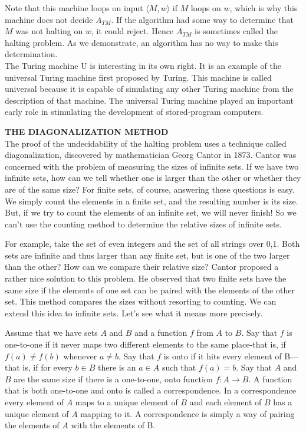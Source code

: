 \documentclass[main.tex]{subfiles}
\begin{document}
Note that this machine loops on input $\langle M, w \rangle$ if $M$ loops on $w$, which is why
this machine does not decide $A_{TM}$. If the algorithm had some way to determine
that $M$ was not halting on $w$, it could reject. Hence $A_{TM}$ is sometimes called
the halting problem. As we demonstrate, an algorithm has no way to make this
determination.\\
The Turing machine U is interesting in its own right. It is an example of
the universal Turing machine first proposed by Turing. This machine is called
universal because it is capable of simulating any other Turing machine from the
description of that machine. The universal Turing machine played an important
early role in stimulating the development of stored-program computers.
\par \textbf{THE DIAGONALIZATION METHOD} \\
The proof of the undecidability of the halting problem uses a technique called
diagonalization, discovered by mathematician Georg Cantor in 1873. Cantor was
concerned with the problem of measuring the sizes of infinite sets. If we have
two infinite sets, how can we tell whether one is larger than the other or whether
they are of the same size? For finite sets, of course, answering these questions
is easy. We simply count the elements in a finite set, and the resulting number
is its size. But, if we try to count the elements of an infinite set, we will never
finish! So we can’t use the counting method to determine the relative sizes of
infinite sets. 
\par For example, take the set of even integers and the set of all strings over {0,1}.
Both sets are infinite and thus larger than any finite set, but is one of the two
larger than the other? How can we compare their relative size?
Cantor proposed a rather nice solution to this problem. He observed that two
finite sets have the same size if the elements of one set can be paired with the
elements of the other set. This method compares the sizes without resorting to
counting. We can extend this idea to infinite sets. Let’s see what it means more
precisely.    

\begin{mytheo*}{}
Assume that we have sets $A$ and $B$ and a function $f$ from $A$ to $B$. Say that $f$ is one-to-one if it never maps two different elements to the same place-that is, if $f(a) \neq f (b)$ whenever $a \neq b$. Say that $f$ is onto if it hits every element of B—that is, if for every $b \in B$ there is an $a \in A$ such that $f (a) = b$. Say that $A$ and $B$ are the same size if there is a one-to-one, onto function $f : A \longrightarrow B$. A function that is both one-to-one and onto is called a correspondence. In a correspondence every element of $A$ maps to a unique element of $B$ and each element of $B$ has a unique element of $A$ mapping to it. A correspondence is simply a way of pairing the elements of $A$ with the elements of B. 
\end{mytheo*}
\end{document}
